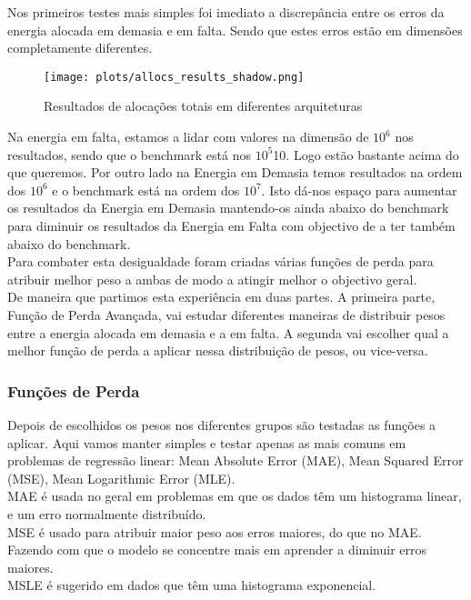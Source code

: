 Nos primeiros testes mais simples foi imediato a discrepância entre os erros da energia alocada em demasia e em falta. Sendo que estes erros estão em dimensões completamente diferentes.
\begin{figure}[H]
    \centering
    \texttt{[image: plots/allocs\_results\_shadow.png]}
    \caption{Resultados de alocações totais em diferentes arquiteturas}
    \label{fig:resexparchs}
  \end{figure}

Na energia em falta, estamos a lidar com valores na dimensão de $10^{6}$ nos resultados, sendo que o benchmark está nos $10^{5}$10. Logo estão bastante acima do que queremos. Por outro lado na Energia em Demasia temos resultados na ordem dos $10^{6}$ e o benchmark está na ordem dos $10^{7}$. Isto dá-nos espaço para aumentar os resultados da Energia em Demasia mantendo-os ainda abaixo do benchmark para diminuir os resultados da Energia em Falta com objectivo de a ter também abaixo do benchmark.\\
Para combater esta desigualdade foram criadas várias funções de perda para atribuir melhor peso a ambas de modo a atingir melhor o objectivo geral.\\
De maneira que partimos esta experiência em duas partes. A primeira parte, Função de Perda Avançada, vai estudar diferentes maneiras de distribuir pesos entre a energia alocada em demasia e a em falta. A segunda vai escolher qual a melhor função de perda a aplicar nessa distribuição de pesos, ou vice-versa.\\


\subsubsection{Funções de Perda}
Depois de escolhidos os pesos nos diferentes grupos são testadas as funções a aplicar. Aqui vamos manter simples e testar apenas as mais comuns em problemas de regressão linear: Mean Absolute Error (MAE), Mean Squared Error (MSE), Mean Logarithmic Error (MLE).\\
MAE é usada no geral em problemas em que os dados têm um histograma linear, e um erro normalmente distribuído.\\
MSE é usado para atribuir maior peso aos erros maiores, do que no MAE. Fazendo com que o modelo se concentre mais em aprender a diminuir erros maiores.\\
MSLE é sugerido em dados que têm uma histograma exponencial.\\

